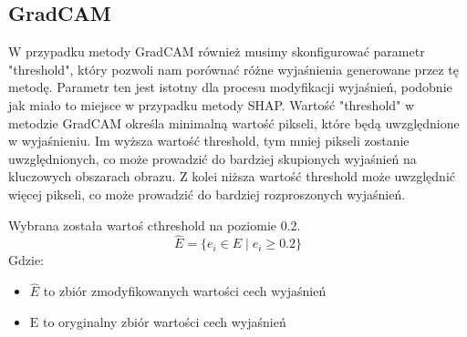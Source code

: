 \subsection*{GradCAM}
W przypadku metody GradCAM również musimy skonfigurować parametr "threshold", który pozwoli nam porównać różne wyjaśnienia generowane przez tę metodę.
Parametr ten jest istotny dla procesu modyfikacji wyjaśnień, podobnie jak miało to miejsce w przypadku metody SHAP.
Wartość "threshold" w metodzie GradCAM określa minimalną wartość pikseli, które będą uwzględnione w wyjaśnieniu.
Im wyższa wartość threshold, tym mniej pikseli zostanie uwzględnionych, co może prowadzić do bardziej skupionych wyjaśnień na kluczowych obszarach obrazu.
Z kolei niższa wartość threshold może uwzględnić więcej pikseli, co może prowadzić do bardziej rozproszonych wyjaśnień.

Wybrana została wartoś cthreshold na poziomie 0.2.
\begin{equation}
	\hat{E} =  \{ e_i \in E \mid e_i \geq 0.2 \}
	\label{eq:modified_explanation_gradcam}
\end{equation}
Gdzie:
\begin{itemize}[label=]
	\item $\hat{E}$ to zbiór zmodyfikowanych wartości cech wyjaśnień
	\item $\text{E}$ to oryginalny zbiór wartości cech wyjaśnień
\end{itemize}

